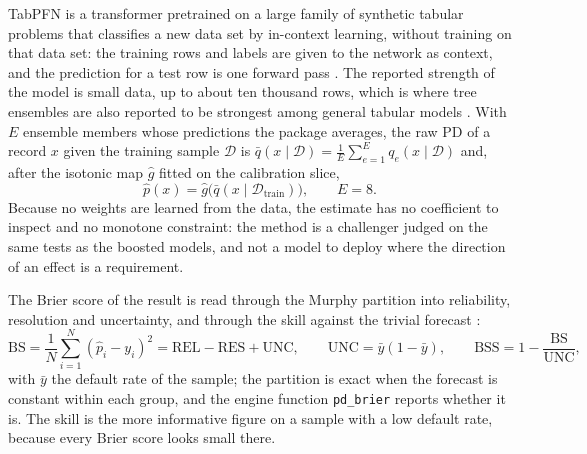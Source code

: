 TabPFN is a transformer pretrained on a large family of synthetic tabular problems that classifies a new data set by
in-context learning, without training on that data set: the training rows and labels are given to the network as context, and the
prediction for a test row is one forward pass \citep{credit-scoring:hollmann2025}. The reported strength of the model is small
data, up to about ten thousand rows, which is where tree ensembles are also reported to be strongest among general tabular
models \citep{credit-scoring:grinsztajn2022}. With $E$ ensemble members whose predictions the package averages, the raw PD of a
record $x$ given the training sample $\mathcal{D}$ is $\bar q(x\mid\mathcal{D})=\frac1E\sum_{e=1}^{E}q_e(x\mid\mathcal{D})$ and,
after the isotonic map $\hat g$ fitted on the calibration slice,
\begin{equation}
\hat p(x)=\hat g\big(\bar q(x\mid\mathcal{D}_{\mathrm{train}})\big),\qquad E=8.
\label{eq:cs-tabpfn}
\end{equation}
Because no weights are learned from the data, the estimate has no coefficient to inspect and no monotone constraint: the method
is a challenger judged on the same tests as the boosted models, and not a model to deploy where the direction of an effect is a
requirement.

The Brier score of the result is read through the Murphy partition into reliability, resolution and uncertainty, and through the
skill against the trivial forecast \citep{credit-scoring:brier1950,credit-scoring:murphy1973}:
\begin{equation}
\mathrm{BS}=\frac1N\sum_{i=1}^{N}(\hat p_i-y_i)^2=\mathrm{REL}-\mathrm{RES}+\mathrm{UNC},\qquad
\mathrm{UNC}=\bar y(1-\bar y),\qquad \mathrm{BSS}=1-\frac{\mathrm{BS}}{\mathrm{UNC}},
\label{eq:cs-brier}
\end{equation}
with $\bar y$ the default rate of the sample; the partition is exact when the forecast is constant within each group, and the
engine function \texttt{pd\_brier} reports whether it is. The skill is the more informative figure on a sample with a low default
rate, because every Brier score looks small there.

